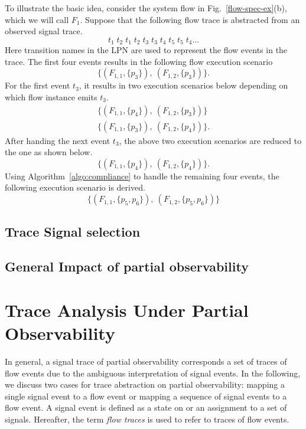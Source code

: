 \documentclass[12pt,frontmatter,copyright,thesis]{usfmanus}
\begin{document}
To illustrate the basic idea, consider the system flow in
Fig.~\ref{flow-spec-ex}(b), which we will call $F_1$.
Suppose that the following flow trace is abstracted from an
observed signal trace.
\[
	t_1\;t_2\;t_1\;t_2\;t_3\;t_3\;t_4\;t_5\;t_5\;t_4\ldots
\]  
Here transition names in the LPN are used to represent the 
flow events in the trace.  The first four events results in
the following flow execution scenario
\[
	\{(F_{1,1}, \{p_3\}),~(F_{1,2}, \{p_3\})\}.
\]
For the first event $t_3$, it results in two execution scenarios 
below depending on which flow instance emits $t_3$.
\[
\begin{array}{l}
	\{(F_{1,1}, \{p_4\}),~(F_{1,2}, \{p_3\})\} \\
	\{(F_{1,1}, \{p_3\}),~(F_{1,2}, \{p_4\})\}.
\end{array}
\]
After handing the next event $t_3$, the above two execution scenarios
are reduced to the one as shown below.
\[
	\{(F_{1,1}, \{p_4\}),~(F_{1,2}, \{p_4\})\}.
\]
Using Algorithm~\ref{algo:compliance} to handle the
remaining four events, the following execution scenario is
derived.
\[
	\{(F_{1,1}, \{p_5, p_6\}),~(F_{1,2}, \{p_5, p_6\})\}
\]


\section{Trace Signal selection}
\section{General Impact of partial observability}



\chapter{Trace Analysis Under Partial Observability}
In general, a signal trace of partial observability
corresponds a set of traces of flow events due to the
ambiguous interpretation of signal events.  In the
following, we discuss two cases for trace abstraction on
partial observability: mapping a single signal event to a
flow event or mapping a sequence of signal events to a flow
event.  A signal event is defined as a state on or an
assignment to a set of signals.
Hereafter, the term {\em flow traces} is used to refer to
traces of flow events.  
\end{document}
